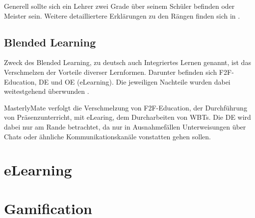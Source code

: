 Generell sollte sich ein Lehrer zwei Grade über seinem Schüler befinden oder
Meister sein. Weitere detailliertere Erklärungen zu den Rängen finden sich in
\cite{gruben:2012}.

\subsection{Blended Learning}\label{ref:blendedLearning}
Zweck des Blended Learning, zu deutsch auch Integriertes Lernen genannt, ist das
Verschmelzen der Vorteile diverser Lernformen. Darunter befinden sich
\ac{F2F}-Education, \ac{DE} und \ac{OE} (eLearning). Die jeweiligen Nachteile
wurden dabei weitestgehend überwunden \cite{kroeger:2004}.

MasterlyMate verfolgt die Verschmelzung von F2F-Education, der Durchführung von
Präsenzunterricht, mit eLearing, dem Durcharbeiten von WBTs. Die DE wird dabei
nur am Rande betrachtet, da nur in Ausnahmefällen Unterweisungen über Chats oder
ähnliche Kommunikationskanäle vonstatten gehen sollen.

\section{eLearning}


\section{Gamification}\label{ref:gamification}